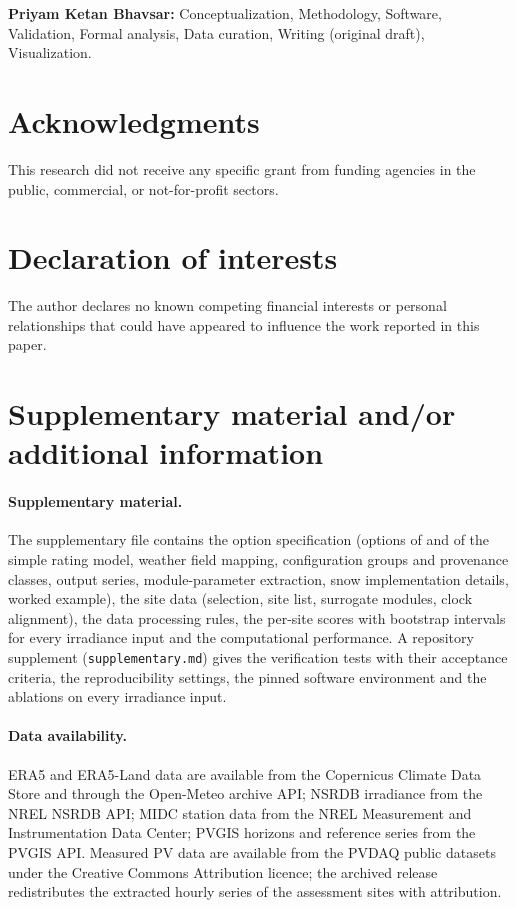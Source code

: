 \documentclass[11pt]{article}
\begin{document}
\textbf{Priyam Ketan Bhavsar:} Conceptualization, Methodology, Software, Validation, Formal analysis, Data curation, Writing (original draft), Visualization. 

\section*{Acknowledgments}


This research did not receive any specific grant from funding agencies in the public, commercial, or not-for-profit sectors. 

\section*{Declaration of interests}

The author declares no known competing financial interests or personal relationships that could have appeared to influence the work reported in this paper.

\section*{Supplementary material and/or additional information}

\paragraph{Supplementary material.}
The supplementary file contains the \RePV{} option specification (options of \RePV{} and of the simple rating model, weather field mapping, configuration groups and provenance classes, output series, module-parameter extraction, snow implementation details, worked example), the site data (selection, site list, surrogate modules, clock alignment), the data processing rules, the per-site scores with bootstrap intervals for every irradiance input and the computational performance. A repository supplement (\texttt{supplementary.md}) gives the verification tests with their acceptance criteria, the reproducibility settings, the pinned software environment and the ablations on every irradiance input.

\paragraph{Data availability.}
ERA5 and ERA5-Land data are available from the Copernicus Climate Data Store and through the Open-Meteo archive API; NSRDB irradiance from the NREL NSRDB API; MIDC station data from the NREL Measurement and Instrumentation Data Center; PVGIS horizons and reference series from the PVGIS API. Measured PV data are available from the PVDAQ public datasets~\cite{deline2021pvdaq} under the Creative Commons Attribution licence; the archived release redistributes the extracted hourly series of the assessment sites with attribution.
\end{document}
